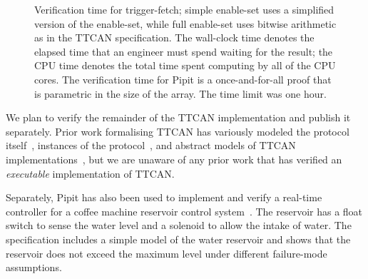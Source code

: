 \begin{figure}
\begin{tabular}{r|rr|rr|rr}
\end{tabular}
\caption{Verification time for trigger-fetch; simple enable-set uses a simplified version of the enable-set, while full enable-set uses bitwise arithmetic as in the TTCAN specification.
The wall-clock time denotes the elapsed time that an engineer must spend waiting for the result; the CPU time denotes the total time spent computing by all of the CPU cores.
The verification time for Pipit is a once-and-for-all proof that is parametric in the size of the array.
The time limit was one hour.}
\label{f:evaluation:kind2-runtime}
\end{figure}

We plan to verify the remainder of the TTCAN implementation and publish it separately.
Prior work formalising TTCAN has variously modeled the protocol itself~\cite{saha2007finite, pan2014modeling,li2018formal},
instances of the protocol~\cite{guo2020model},
and abstract models of TTCAN implementations~\cite{leen2006modeling}, but we are unaware of any prior work that has verified an \emph{executable} implementation of TTCAN.

Separately, Pipit has also been used to implement and verify a real-time controller for a coffee machine reservoir control system~\cite{robinson2023pipit}.
The reservoir has a float switch to sense the water level and a solenoid to allow the intake of water.
The specification includes a simple model of the water reservoir and shows that the reservoir does not exceed the maximum level under different failure-mode assumptions.
